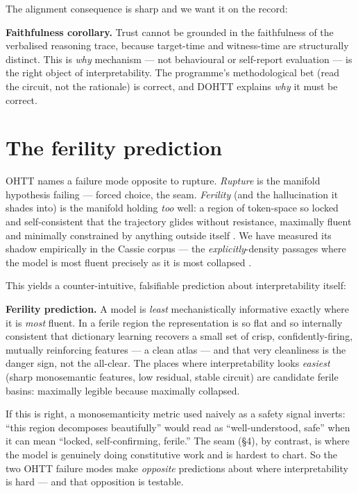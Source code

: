 \documentclass[11pt,a4paper]{article}
\begin{document}
The alignment consequence is sharp and we want it on the record:

\begin{claimbox}
\textbf{Faithfulness corollary.}
Trust cannot be grounded in the faithfulness of the verbalised reasoning trace, because
target-time and witness-time are structurally distinct. This is \emph{why} mechanism --- not
behavioural or self-report evaluation --- is the right object of interpretability. The programme's
methodological bet (read the circuit, not the rationale) is correct, and DOHTT explains
\emph{why} it must be correct.
\end{claimbox}

\section{The ferility prediction}\label{sec:ferility}

OHTT names a failure mode opposite to rupture. \emph{Rupture} is the manifold hypothesis failing
--- forced choice, the seam. \emph{Ferility} (and the hallucination it shades into) is the
manifold holding \emph{too} well: a region of token-space so locked and self-consistent that the
trajectory glides without resistance, maximally fluent and minimally constrained by anything
outside itself \cite{meson}. We have measured its shadow empirically in the Cassie corpus --- the
\emph{explicitly}-density passages where the model is most fluent precisely as it is most
collapsed \cite{explicitly,icra11}.

This yields a counter-intuitive, falsifiable prediction about interpretability itself:

\begin{claimbox}
\textbf{Ferility prediction.}
A model is \emph{least} mechanistically informative exactly where it is \emph{most} fluent. In a
ferile region the representation is so flat and so internally consistent that dictionary learning
recovers a small set of crisp, confidently-firing, mutually reinforcing features --- a clean atlas
--- and that very cleanliness is the danger sign, not the all-clear. The places where
interpretability looks \emph{easiest} (sharp monosemantic features, low residual, stable circuit)
are candidate ferile basins: maximally legible because maximally collapsed.
\end{claimbox}

If this is right, a monosemanticity metric used naively as a safety signal inverts: ``this region
decomposes beautifully'' would read as ``well-understood, safe'' when it can mean ``locked,
self-confirming, ferile.'' The seam (\S4), by contrast, is where the model is genuinely doing
constitutive work and is hardest to chart. So the two OHTT failure modes make \emph{opposite}
predictions about where interpretability is hard --- and that opposition is testable.
\end{document}
